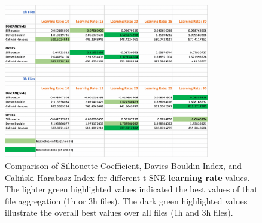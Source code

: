 \begin{figure}
  \centering
  \includegraphics[width=0.8\textwidth]{./images/tsneParametersTest/learningRate/learningRateEvaluationScoresDetailed3.png}
  \caption{Comparison of Silhouette Coefficient, Davies-Bouldin Index, and Caliński-Harabasz Index for different t-SNE \textbf{learning rate} values. The lighter green highlighted values indicated the best values of that file aggregation (1h or 3h files). The dark green highlighted values illustrate the overall best values over all files (1h and 3h files).}
  \label{figure:learningRateEvaluationScoresDetailed3}
\end{figure}



